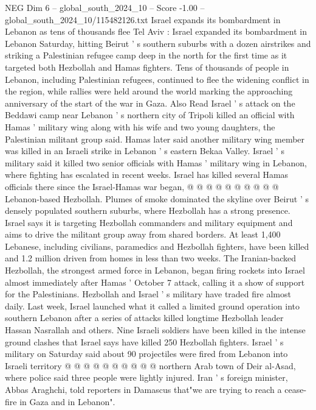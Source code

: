 \begin{textsample}{NEG Dim 6 – global\_south\_2024\_10 – Score -1.00 – global\_south\_2024\_10/115482126.txt}  \label{ex:f6_neg_055}
Israel expands its bombardment in Lebanon as tens of thousands flee Tel Aviv : Israel expanded its bombardment in Lebanon Saturday, hitting Beirut ' s southern suburbs with a dozen airstrikes and striking a Palestinian refugee camp deep in the north for the first time as it targeted both Hezbollah and Hamas fighters.
Tens of thousands of people in Lebanon, including Palestinian refugees, continued to flee the widening conflict in the region, while rallies were held around the world marking the approaching anniversary of the start of the war in Gaza.
Also Read Israel ' s attack on the Beddawi camp near Lebanon ' s northern city of Tripoli killed an official with Hamas ' military wing along with his wife and two young daughters, the Palestinian militant group said.
Hamas later said another military wing member was killed in an Israeli strike in Lebanon ' s eastern Bekaa Valley.
Israel ' s military said it killed two senior officials with Hamas ' military wing in Lebanon, where fighting has escalated in recent weeks.
Israel has killed several Hamas officials there since the Israel-Hamas war began, @ @ @ @ @ @ @ @ @ @ Lebanon-based Hezbollah.
Plumes of smoke dominated the skyline over Beirut ' s densely populated southern suburbs, where Hezbollah has a strong presence.
Israel says it is targeting Hezbollah commanders and military equipment and aims to drive the militant group away from shared borders.
At least 1,400 Lebanese, including civilians, paramedics and Hezbollah fighters, have been killed and 1.2 million driven from homes in less than two weeks.
The Iranian-backed Hezbollah, the strongest armed force in Lebanon, began firing rockets into Israel almost immediately after Hamas ' October 7 attack, calling it a show of support for the Palestinians.
Hezbollah and Israel ' s military have traded fire almost daily.
Last week, Israel launched what it called a limited ground operation into southern Lebanon after a series of attacks killed longtime Hezbollah leader Hassan Nasrallah and others.
Nine Israeli soldiers have been killed in the intense ground clashes that Israel says have killed 250 Hezbollah fighters.
Israel ' s military on Saturday said about 90 projectiles were fired from Lebanon into Israeli territory @ @ @ @ @ @ @ @ @ @ northern Arab town of Deir al-Asad, where police said three people were lightly injured.
Iran ' s foreign minister, Abbas Araghchi, told reporters in Damascus that"we are trying to reach a cease-fire in Gaza and in Lebanon".

\end{textsample}

